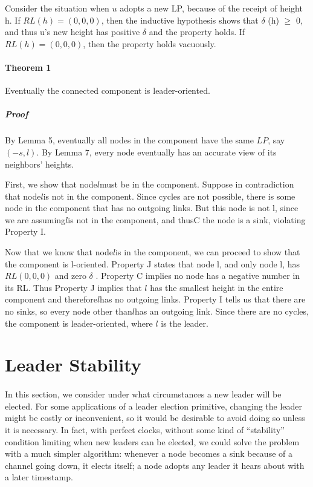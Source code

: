 Consider the situation when $u$ adopts a new LP, because of the receipt of height h. If $RL(h) = (0, 0, 0)$, then the inductive hypothesis shows that $\delta$ (h) $\geq$ 0, and thus u’s new height has positive $\delta$ and the property holds. If $RL(h) = (0, 0, 0)$, then the property holds vacuously.

\paragraph{Theorem 1}Eventually the connected component is leader-oriented.
\subparagraph{Proof}By Lemma 5, eventually all nodes in the component have the same $LP$, say $(-s, l)$. By Lemma 7, every node eventually has an accurate view of its neighbors’ heights. 

First, we show that node$ l $must be in the component. Suppose in contradiction that node$ l $is not in the component. Since cycles are not possible, there is some node in the component that has no outgoing links. But this node is not l, since we are assuming$ l $is not in the component, and thusC the node is a sink, violating Property I.

Now that we know that node$ l $is in the component, we can proceed to show that the component is l-oriented. Property J states that node l, and only node l, has $RL (0,0,0)$ and zero $\delta$ . Property C implies no node has a negative number in its RL. Thus Property J implies that $ l $ has the smallest height in the entire component and therefore$ l $has no outgoing links. Property I tells us that there are no sinks, so every node other than$ l $has an outgoing link. Since there are no cycles, the component is leader-oriented, where $ l $ is the leader.
\section{Leader Stability}

\paragraph{}In this section, we consider under what circumstances a new leader will be elected. For some applications of a leader election primitive, changing the leader might be costly or inconvenient, so it would be desirable to avoid doing so unless it is necessary. In fact, with perfect clocks, without some kind of “stability” condition limiting when new leaders can be elected, we could solve the problem with a much simpler algorithm: whenever a node becomes a sink because of a channel going down, it elects itself; a node adopts any leader it hears about with a later timestamp.
